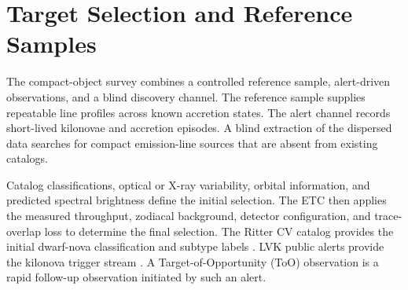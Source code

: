 \documentclass[10pt,onecolumn]{article}
\begin{document}
\section{Target Selection and Reference Samples}

The compact-object survey combines a controlled reference sample,
alert-driven observations, and a blind discovery channel. The reference
sample supplies repeatable line profiles across known accretion states. The
alert channel records short-lived kilonovae and accretion episodes. A blind
extraction of the dispersed data searches for compact emission-line sources
that are absent from existing catalogs.

Catalog classifications, optical or X-ray variability, orbital information,
and predicted spectral brightness define the initial selection. The ETC then
applies the measured throughput, zodiacal background, detector configuration,
and trace-overlap loss to determine the final selection. The Ritter CV
catalog provides the initial dwarf-nova classification and subtype labels
\cite{rittercv}. LVK public alerts provide the kilonova trigger stream
\cite{lvkalerts}. A Target-of-Opportunity (ToO) observation is a rapid
follow-up observation initiated by such an alert.
\end{document}
